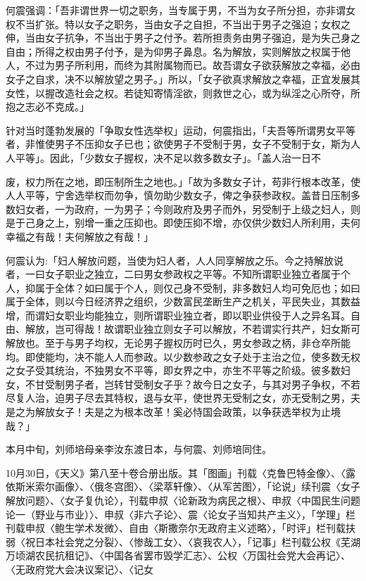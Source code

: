 何震强调：「吾非谓世界一切之职务，当专属于男，不当为女子所分担，亦非谓女权不当扩张。特以女子之职务，当由女子之自担，不当出于男子之强迫；女权之伸，当由女子抗争，不当出于男子之付予。若所担责务由男子强迫，是为失己身之自由；所得之权由男子付予，是为仰男子鼻息。名为解放，实则解放之权属于他人，不过为男子所利用，而终为其附属物而已。故吾谓女子欲获解放之幸福，必由女子之自求，决不以解放望之男子。」所以，「女子欲真求解放之幸福，正宜发展其女性，以握改造社会之权。若徒知寄情淫欲，则救世之心，或为纵淫之心所夺，所抱之志必不克成。」

针对当时蓬勃发展的「争取女性选举权」运动，何震指出，「夫吾等所谓男女平等者，非惟使男子不压抑女子已也；欲使男子不受制于男，女子不受制于女，斯为人人平等」。因此，「少数女子握权，决不足以救多数女子」。「盖人治一日不


\noindent 废，权力所在之地，即压制所生之地也。」「故为多数女子计，苟非行根本改革，使人人平等，宁舍选举权而勿争，慎勿助少数女子，俾之争获参政权。盖昔日压制多数妇女者，一为政府，一为男子；今则政府及男子而外，另受制于上级之妇人，则是于己身之上，别增一重之压抑也。即使压抑不增，亦仅供少数妇人所利用，夫何幸福之有哉！夫何解放之有哉！」

何震认为:「妇人解放问题，当使为妇人者，人人同享解放之乐。今之持解放说者，一曰女子职业之独立，二曰男女参政权之平等。不知所谓职业独立者属于个人，抑属于全体？如曰属于个人，则仅己身不受制，非多数妇人均可免厄也；如曰属于全体，则以今日经济界之组织，少数富民垄断生产之机关，平民失业，其数益增，而谓妇女职业均能独立，则所谓职业独立者，即以职业供役于人之异名耳。自由、解放，岂可得哉！故谓职业独立则女子可以解放，不若谓实行共产，妇女斯可解放也。至于与男子均权，无论男子握权历时已久，男女参政之柄，非仓卒所能均。即使能均，决不能人人而参政。以少数参政之女子处于主治之位，使多数无权之女子受其统治，不独男女不平等，即女界之中，亦生不平等之阶级。彼多数妇女，不甘受制男子者，岂转甘受制女子乎？故今日之女子，与其对男子争权，不若尽复人治，迫男子尽去其特权，退与女平，使世界无受制之女，亦无受制之男，夫是之为解放女子！夫是之为根本改革！奚必恃国会政策，以争获选举权为止境哉？」

本月中旬，刘师培母亲李汝东渡日本，与何震、刘师培同住。

10月30日，《天义》第八至十卷合册出版。其「图画」刊载〈克鲁巴特金像〉、〈露依斯米索尔画像〉、〈俄冬宫图〉、〈梁萃轩像〉、〈从军苦图〉，「论说」续刊震〈女子解放问题〉、〈女子复仇论〉，刊载申叔〈论新政为病民之根〉、申叔〈中国民生问题论一（野业与市业）〉、申叔〈非六子论〉、震〈论女子当知共产主义〉，「学理」栏刊载申叔〈鲍生学术发微〉、自由〈斯撒奈尔无政府主义述略〉，「时评」栏刊载扶弱〈祝日本社会党之分裂〉、〈惨哉工女〉、〈哀我农人〉，「记事」栏刊载公权《芜湖万顷湖农民抗租记》、〈中国各省罢市毁学汇志〉、公权〈万国社会党大会再记〉、〈无政府党大会决议案记〉、〈记女



